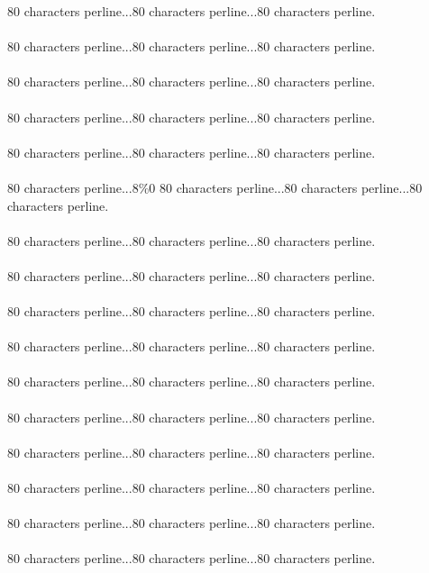 {
80 characters perline...80 characters perline...80 characters perline.\asdf\\\\
80 characters perline...80 characters perline...80 characters perline.\asdf\\\\
80 characters perline...80 characters perline...80 characters perline.\asdf\\\\
80 characters perline...80 characters perline...80 characters perline.\asdf\\\\
80 characters perline...80 characters perline...80 characters perline.\asdf\\\\
80 characters perline...8\%0 %
80 characters perline...80 characters perline...80 characters perline.\asdf\\\\
80 characters perline...80 characters perline...80 characters perline.\asdf\\\\
80 characters perline...80 characters perline...80 characters perline.\asdf\\\\
80 characters perline...80 characters perline...80 characters perline.\asdf\\\\
80 characters perline...80 characters perline...80 characters perline.\asdf\\\\
80 characters perline...80 characters perline...80 characters perline.\asdf\\\\
80 characters perline...80 characters perline...80 characters perline.\asdf\\\\
80 characters perline...80 characters perline...80 characters perline.\asdf\\\\
80 characters perline...80 characters perline...80 characters perline.\asdf\\\\
80 characters perline...80 characters perline...80 characters perline.\asdf\\\\
80 characters perline...80 characters perline...80 characters perline.\asdf\\\\
}
